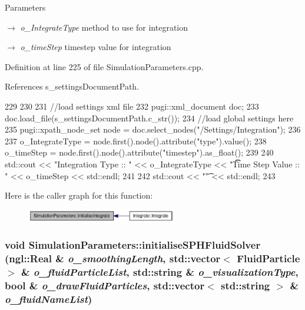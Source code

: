 \begin{DoxyParams}{Parameters}
\item[\mbox{$\rightarrow$} {\em o\_\-IntegrateType}]method to use for integration \item[\mbox{$\rightarrow$} {\em o\_\-timeStep}]timestep value for integration \end{DoxyParams}


Definition at line 225 of file SimulationParameters.cpp.



References s\_\-settingsDocumentPath.




\begin{DoxyCode}
229 {
230 
231     //load settings xml file
232     pugi::xml_document doc;
233     doc.load_file(s_settingsDocumentPath.c_str());
234     //load global settings here
235     pugi::xpath_node_set node = doc.select_nodes("/Settings/Integration");
236 
237     o_IntegrateType = node.first().node().attribute("type").value();
238     o_timeStep = node.first().node().attribute("timestep").as_float();
239 
240     std::cout << "\n Integration Type :: " << o_IntegrateType << "\t \t Time Step
       Value :: " << o_timeStep << std::endl;
241 
242     std::cout << "\t" << std::endl;
243 }
\end{DoxyCode}




Here is the caller graph for this function:\nopagebreak
\begin{figure}[H]
\begin{center}
\leavevmode
\includegraphics[width=185pt]{class_simulation_parameters_a3ed48742e248d138da5cbe4d5068b576_icgraph}
\end{center}
\end{figure}


\hypertarget{class_simulation_parameters_aa9389962f767734ad8f0ffc63cb0ed46}{
\subsubsection[{initialiseSPHFluidSolver}]{\setlength{\rightskip}{0pt plus 5cm}void SimulationParameters::initialiseSPHFluidSolver (ngl::Real \& {\em o\_\-smoothingLength}, \/  std::vector$<$ {\bf FluidParticle} $>$ \& {\em o\_\-fluidParticleList}, \/  std::string \& {\em o\_\-visualizationType}, \/  bool \& {\em o\_\-drawFluidParticles}, \/  std::vector$<$ std::string $>$ \& {\em o\_\-fluidNameList})}}
\label{class_simulation_parameters_aa9389962f767734ad8f0ffc63cb0ed46}


